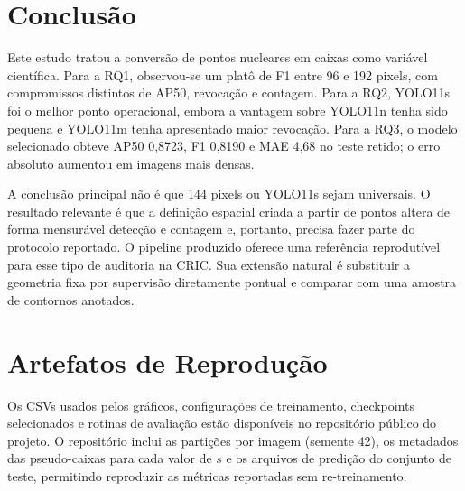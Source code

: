 ﻿\FloatBarrier
\section{Conclus\~ao}

Este estudo tratou a convers\~ao de pontos nucleares em caixas como vari\'avel
cient\'ifica. Para a RQ1, observou-se um plat\^o de F1 entre 96 e 192 pixels, com
compromissos distintos de AP50, revoca\c{c}\~ao e contagem. Para a RQ2, YOLO11s
foi o melhor ponto operacional, embora a vantagem sobre YOLO11n tenha sido
pequena e YOLO11m tenha apresentado maior revoca\c{c}\~ao. Para a RQ3, o modelo
selecionado obteve AP50 0,8723, F1 0,8190 e MAE 4,68 no teste retido; o erro
absoluto aumentou em imagens mais densas.

A conclus\~ao principal n\~ao \'e que 144 pixels ou YOLO11s sejam universais. O
resultado relevante \'e que a defini\c{c}\~ao espacial criada a partir de pontos
altera de forma mensur\'avel detec\c{c}\~ao e contagem e, portanto, precisa fazer
parte do protocolo reportado. O pipeline produzido oferece uma refer\^encia
reprodut\'ivel para esse tipo de auditoria na CRIC. Sua extens\~ao natural \'e
substituir a geometria fixa por supervis\~ao diretamente pontual e comparar com
uma amostra de contornos anotados.

\section*{Artefatos de Reprodu\c{c}\~ao}

Os CSVs usados pelos gr\'aficos, configura\c{c}\~oes de treinamento, checkpoints
selecionados e rotinas de avalia\c{c}\~ao est\~ao dispon\'iveis no reposit\'orio
p\'ublico do projeto. O reposit\'orio inclui as parti\c{c}\~oes por imagem (semente
42), os metadados das pseudo-caixas para cada valor de $s$ e os arquivos de
predi\c{c}\~ao do conjunto de teste, permitindo reproduzir as m\'etricas reportadas
sem re-treinamento.
